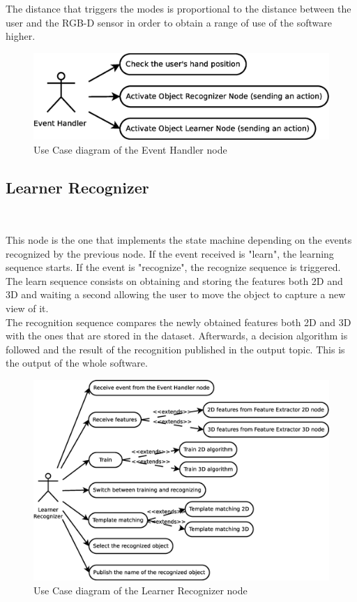 	The distance that triggers the modes is proportional to the distance between the user and the RGB-D sensor in order to obtain a range of use of the software higher. 
	\begin{figure}[h]
		\begin{center}
			\includegraphics[scale=0.2]{img/diagrams/uc_event_handler.eps}
			\caption[Use case diagram Event Handler node]{Use Case diagram of the Event Handler node}
		\end{center}
	\end{figure}

\subsection{Learner Recognizer}\\
\label{learner_recognizer}

	This node is the one that implements the state machine depending on the events recognized by the previous node. If the event received is "learn", the learning sequence starts. If the event is "recognize", the recognize sequence is triggered. 
	\\

	The learn sequence consists on obtaining and storing the features both 2D and 3D and waiting a second allowing the user to move the object to capture a new view of it. 
	\\

	The recognition sequence compares the newly obtained features both 2D and 3D with the ones that are stored in the dataset. Afterwards, a decision algorithm is followed and the result of the recognition published in the output topic. This is the output of the whole software. 

	\begin{figure}[h]
		\begin{center}
			\includegraphics[scale=0.2]{img/diagrams/uc_learner_recognizer.eps}
			\caption[Use case diagram Learner Recognizer node]{Use Case diagram of the Learner Recognizer node}
		\end{center}
	\end{figure}



